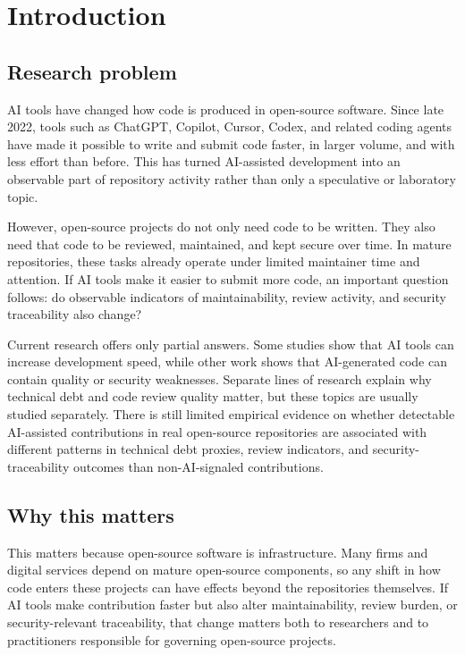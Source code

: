 \chapter{Introduction}
\label{ch:introduction}

\section{Research problem}
AI tools have changed how code is produced in open-source software. Since late 2022, tools such as ChatGPT, Copilot, Cursor, Codex, and related coding agents have made it possible to write and submit code faster, in larger volume, and with less effort than before. This has turned AI-assisted development into an observable part of repository activity rather than only a speculative or laboratory topic.

However, open-source projects do not only need code to be written. They also need that code to be reviewed, maintained, and kept secure over time. In mature repositories, these tasks already operate under limited maintainer time and attention. If AI tools make it easier to submit more code, an important question follows: do observable indicators of maintainability, review activity, and security traceability also change?

Current research offers only partial answers. Some studies show that AI tools can increase development speed, while other work shows that AI-generated code can contain quality or security weaknesses. Separate lines of research explain why technical debt and code review quality matter, but these topics are usually studied separately. There is still limited empirical evidence on whether detectable AI-assisted contributions in real open-source repositories are associated with different patterns in technical debt proxies, review indicators, and security-traceability outcomes than non-AI-signaled contributions.

\section{Why this matters}
This matters because open-source software is infrastructure. Many firms and digital services depend on mature open-source components, so any shift in how code enters these projects can have effects beyond the repositories themselves. If AI tools make contribution faster but also alter maintainability, review burden, or security-relevant traceability, that change matters both to researchers and to practitioners responsible for governing open-source projects.

